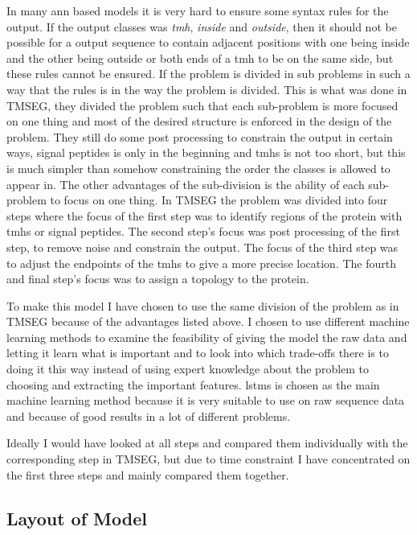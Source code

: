 In many \gls{ann} based models it is very hard to ensure some syntax rules for the output. If the output 
classes was \emph{\gls{tmh}}, \emph{inside} and \emph{outside}, then it should not be possible for a output sequence to contain 
adjacent positions with one being inside and the other being outside or both ends of a \gls{tmh} to be on the 
same side, but these rules cannot be ensured. If the problem is divided in sub problems in such a way that 
the rules is in the way the problem is divided. This is what was done in TMSEG\cite{tmseg}, they divided 
the problem such that each sub-problem is more focused on one thing and most of the desired structure is 
enforced in the design of the problem. They still do some post processing to constrain the output in certain ways, 
signal peptides is only in the beginning and \glspl{tmh} is not too short, but this is much simpler than 
somehow constraining the order the classes is allowed to appear in. The other advantages of the sub-division 
is the ability of each sub-problem to focus on one thing. In TMSEG the problem was divided into four steps
where the focus of the first step was to identify regions of the protein with \glspl{tmh} or signal peptides.
The second step's focus was post processing of the first step, to remove noise and constrain the output.
The focus of the third step was to adjust the endpoints of the \glspl{tmh} to give a more precise location.
The fourth and final step's focus was to assign a topology to the protein. 

To make this model I have chosen to use the same division of the problem as in TMSEG because of the 
advantages listed above. I chosen to use different machine learning methods to examine the feasibility 
of giving the model the raw data and letting it learn what is important and to look into which trade-offs
there is to doing it this way instead of using expert knowledge about the problem to choosing and extracting 
the important features. \glspl{lstm} is chosen as the main machine learning method because it is very suitable
to use on raw sequence data and because of good results in a lot of different problems. 

Ideally I would have looked at all steps and compared them individually with the corresponding step in TMSEG,
but due to time constraint I have concentrated on the first three steps and mainly compared them together.

\subsection{Layout of Model}

